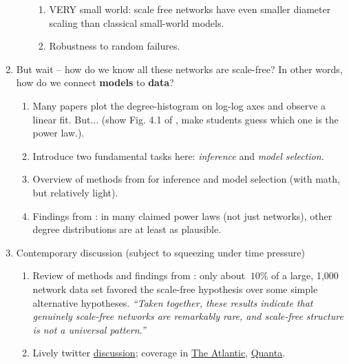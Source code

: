 \documentclass[english]{scrartcl}
\begin{document}
\begin{enumerate}
\begin{itemize}
\begin{enumerate}
			\item VERY small world: scale free networks have even smaller diameter scaling than classical small-world models. \cite{Cohen2003a}
			\item Robustness to random failures. 
		\end{enumerate}
	\end{itemize}
	\item But wait -- how do we know all these networks are scale-free? In other words, how do we connect \textbf{models} to \textbf{data}? 
	\begin{enumerate}
		\item Many papers plot the degree-histogram on log-log axes and observe a linear fit. But... (show Fig. 4.1 of \cite{Clauset2009}, make students guess which one is the power law.).
		\item Introduce two fundamental tasks here: \emph{inference} and \emph{model selection.} 
		\item Overview of methods from \cite{Clauset2009} for inference and model selection (with math, but relatively light). 
		\item Findings from \cite{Clauset2009}: in many claimed power laws (not just networks), other degree distributions are at least as plausible. 
	\end{enumerate}
	\item Contemporary discussion (subject to squeezing under time pressure)
	\begin{enumerate}
		\item Review of methods and findings from \cite{Broido2017}: only about $~10\%$ of a large, 1,000 network data set favored the scale-free hypothesis over some simple alternative hypotheses. \emph{``Taken together, these results indicate that genuinely scale-free networks are remarkably rare, and scale-free structure is not a universal pattern.''}
		\item Lively twitter \href{https://twitter.com/manlius84/timelines/952248309720211458}{discussion}; coverage in \href{https://www.theatlantic.com/science/archive/2018/02/power-laws-networks/553562/}{The Atlantic}, \href{https://www.quantamagazine.org/scant-evidence-of-power-laws-found-in-real-world-networks-20180215/}{Quanta}.
	\end{enumerate}
\end{enumerate}

{}

\end{document}
